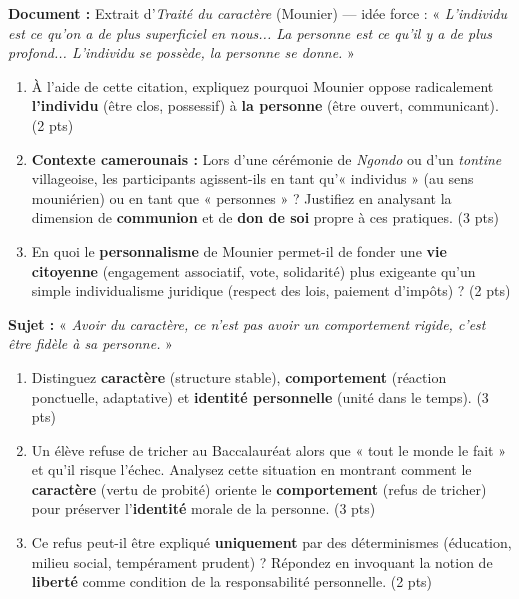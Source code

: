 \documentclass[11pt]{article}
\begin{document}
\begin{exercice}
\textbf{Document :} Extrait d'\textit{Traité du caractère} (Mounier) — idée force : « \textit{L'individu est ce qu'on a de plus superficiel en nous... La personne est ce qu'il y a de plus profond... L'individu se possède, la personne se donne.} »
\begin{enumerate}
    \item À l'aide de cette citation, expliquez pourquoi Mounier oppose radicalement \textbf{l'individu} (être clos, possessif) à \textbf{la personne} (être ouvert, communicant). (2 pts)
    \item \textbf{Contexte camerounais :} Lors d'une cérémonie de \textit{Ngondo} ou d'un \textit{tontine} villageoise, les participants agissent-ils en tant qu'« individus » (au sens mouniérien) ou en tant que « personnes » ? Justifiez en analysant la dimension de \textbf{communion} et de \textbf{don de soi} propre à ces pratiques. (3 pts)
    \item En quoi le \textbf{personnalisme} de Mounier permet-il de fonder une \textbf{vie citoyenne} (engagement associatif, vote, solidarité) plus exigeante qu'un simple individualisme juridique (respect des lois, paiement d'impôts) ? (2 pts)
\end{enumerate}
\end{exercice}

\begin{exercice}
\textbf{Sujet :} « \textit{Avoir du caractère, ce n'est pas avoir un comportement rigide, c'est être fidèle à sa personne.} »
\begin{enumerate}
    \item Distinguez \textbf{caractère} (structure stable), \textbf{comportement} (réaction ponctuelle, adaptative) et \textbf{identité personnelle} (unité dans le temps). (3 pts)
    \item Un élève refuse de tricher au Baccalauréat alors que « tout le monde le fait » et qu'il risque l'échec. Analysez cette situation en montrant comment le \textbf{caractère} (vertu de probité) oriente le \textbf{comportement} (refus de tricher) pour préserver l'\textbf{identité} morale de la personne. (3 pts)
    \item Ce refus peut-il être expliqué \textbf{uniquement} par des déterminismes (éducation, milieu social, tempérament prudent) ? Répondez en invoquant la notion de \textbf{liberté} comme condition de la responsabilité personnelle. (2 pts)
\end{enumerate}
\end{exercice}
\end{document}
